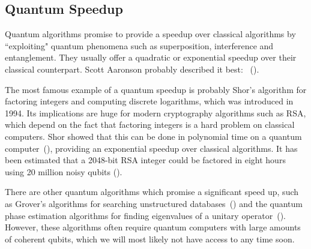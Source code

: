 \documentclass[a4paper,10pt]{article}
\begin{document}
\subsection{Quantum Speedup}
Quantum algorithms promise to provide a speedup over classical algorithms by ``exploiting" quantum phenomena such as superposition, interference and entanglement.
They usually offer a quadratic or exponential speedup over their classical counterpart.
Scott Aaronson probably described it best:
~(\cite{scott-aaronson-qc}).

The most famous example of a quantum speedup is probably Shor's algorithm for factoring integers and computing discrete logarithms, which was introduced in 1994.
Its implications are huge for modern cryptography algorithms such as RSA, which depend on the fact that factoring integers is a hard problem on classical computers.
Shor showed that this can be done in polynomial time on a quantum computer~(\cite{shor-factoring}), providing an exponential speedup over classical algorithms. 
It has been estimated that a 2048-bit RSA integer could be factored in eight hours using 20 million noisy qubits (\cite{shor-20mil}).

There are other quantum algorithms which promise a significant speed up, such as Grover's algorithms for searching unstructured databases~(\cite{grover-search}) and the quantum phase estimation algorithms for finding eigenvalues of a unitary operator~(\cite{nielsen-chuang}).
However, these algorithms often require quantum computers with large amounts of coherent qubits, which we will most likely not have access to any time soon.
\end{document}
